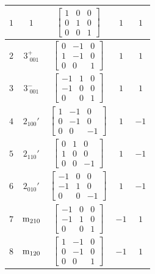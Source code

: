 \documentclass[fleqn,8pt]{jsarticle}
\begin{document}
\begin{longtable}{ccccc}
$ 1 $ & $ 1 $ & $ \begin{bmatrix} 1 & 0 & 0 \\ 0 & 1 & 0 \\ 0 & 0 & 1 \end{bmatrix} $ & $ 1 $ & $ 1 $ \\ \hline
$ 2 $ & $ 3^{+}_{\,\,001} $ & $ \begin{bmatrix} 0 & -1 & 0 \\ 1 & -1 & 0 \\ 0 & 0 & 1 \end{bmatrix} $ & $ 1 $ & $ 1 $ \\ \hline
$ 3 $ & $ 3^{-}_{\,\,001} $ & $ \begin{bmatrix} -1 & 1 & 0 \\ -1 & 0 & 0 \\ 0 & 0 & 1 \end{bmatrix} $ & $ 1 $ & $ 1 $ \\ \hline
$ 4 $ & $ 2{}_{100}{}' $ & $ \begin{bmatrix} 1 & -1 & 0 \\ 0 & -1 & 0 \\ 0 & 0 & -1 \end{bmatrix} $ & $ 1 $ & $ -1 $ \\ \hline
$ 5 $ & $ 2{}_{110}{}' $ & $ \begin{bmatrix} 0 & 1 & 0 \\ 1 & 0 & 0 \\ 0 & 0 & -1 \end{bmatrix} $ & $ 1 $ & $ -1 $ \\ \hline
$ 6 $ & $ 2{}_{010}{}' $ & $ \begin{bmatrix} -1 & 0 & 0 \\ -1 & 1 & 0 \\ 0 & 0 & -1 \end{bmatrix} $ & $ 1 $ & $ -1 $ \\ \hline
$ 7 $ & $ {\rm m}_{210} $ & $ \begin{bmatrix} -1 & 0 & 0 \\ -1 & 1 & 0 \\ 0 & 0 & 1 \end{bmatrix} $ & $ -1 $ & $ 1 $ \\ \hline
$ 8 $ & $ {\rm m}_{120} $ & $ \begin{bmatrix} 1 & -1 & 0 \\ 0 & -1 & 0 \\ 0 & 0 & 1 \end{bmatrix} $ & $ -1 $ & $ 1 $ \\ \hline

\end{longtable}
\end{document}

